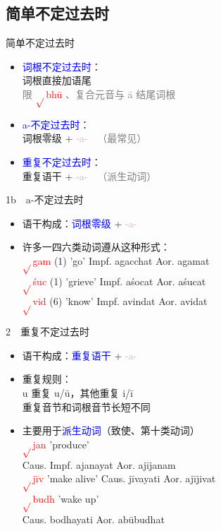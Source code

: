 \documentclass[17pt]{beamer}
\newcommand{\verbroot}[1]{\textcolor{red}{$\sqrt{}$#1}}
\newcommand{\fullpada}[1]{\textcolor{OliveGreen}{#1}}
\newcommand{\pratyaya}[1]{\mbox{\textcolor{Plum}{#1}}}
\newcommand{\important}[1]{\textcolor{blue}{#1}}
\newcommand{\notsoimportant}[1]{\textcolor{gray}{#1}}
\begin{document}
\subsection{简单不定过去时}
\begin{frame}{简单不定过去时}
  \begin{itemize}
    \item[1a)] \important{词根不定过去时}：\\
    词根直接加语尾 \\
    \notsoimportant{限 \verbroot{bhū} 、复合元音与 ā 结尾词根}
    \item[1b)] \important{a-不定过去时}：\\词根零级 + \pratyaya{-a-}~~\notsoimportant{（最常见）}
    \item[2)] \important{重复不定过去时}：\\重复语干 + \pratyaya{-a-}~~\notsoimportant{（派生动词）}
  \end{itemize}
\end{frame}



\begin{frame}{1b~~a-不定过去时}
  \small
  \begin{itemize}
    \item 语干构成：\important{词根零级} + \pratyaya{-a-} 
    \item 许多一四六类动词遵从这种形式：\\
    \verbroot{gam} (1) 'go'  Impf. \fullpada{agacchat} Aor. \fullpada{agamat}\\
    \verbroot{śuc} (1) 'grieve'  Impf. \fullpada{aśocat} Aor. \fullpada{aśucat}\\
    \verbroot{vid} (6) 'know'  Impf. \fullpada{avindat} Aor. \fullpada{avidat}\\
  \end{itemize}
\end{frame}

\begin{frame}{2~~重复不定过去时}
  \small
  \begin{itemize}
    \item 语干构成：\important{重复语干} + \pratyaya{-a-} 
    \item 重复规则：\\
    u 重复 u/ū，其他重复 i/ī\\
    重复音节和词根音节长短不同
    \item 主要用于\important{派生动词}（致使、第十类动词）\\
    \verbroot{jan} 'produce' \\ Caus. Impf. \fullpada{ajanayat} Aor. \fullpada{ajījanam}\\
    \verbroot{jīv} 'make alive'  Caus. \fullpada{jīvayati} Aor. \fullpada{ajījivat}\\
    \verbroot{budh} 'wake up' \\ Caus. \fullpada{bodhayati} Aor. \fullpada{abūbudhat}\\
  \end{itemize}
\end{frame}
\end{document}
